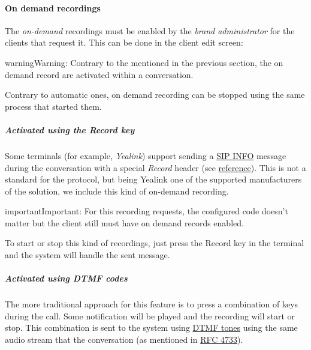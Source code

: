 \documentclass[letterpaper,10pt,english]{sphinxmanual}
\begin{document}
\paragraph{On demand recordings}
\label{administration_portal/client/residential/calls/call_recordings:on-demand-recordings}
The \emph{on-demand} recordings must be enabled by the \emph{brand administrator} for the
clients that request it. This can be done in the client edit screen:

\begin{notice}{warning}{Warning:}
Contrary to the {\hyperref[administration_portal/client/vpbx/services:services]{}} mentioned in the
previous section, the on demand record are activated within a conversation.
\end{notice}

Contrary to automatic ones, on demand recording can be stopped using the same
process that started them.


\subparagraph{Activated using the \emph{Record} key}
\label{administration_portal/client/residential/calls/call_recordings:activated-using-the-record-key}
Some terminals (for example, \emph{Yealink}) support sending a \href{https://tools.ietf.org/html/rfc6086}{SIP INFO} message during the conversation with a
special \emph{Record} header (see \href{http://www.yealink.com/Upload/document/UsingCallRecordingFeatureonYealinkPhones/UsingCallRecordingFeatureonYealinkSIPT2XPphonesRev\_610-20561729764.pdf}{reference}).
This is not a standard for the protocol, but being Yealink one of the supported
manufacturers of the solution, we include this kind of on-demand recording.

\begin{notice}{important}{Important:}
For this recording requests, the configured code doesn't matter
but the client still must have on demand records enabled.
\end{notice}

To start or stop this kind of recordings, just press the Record key in the
terminal and the system will handle the sent message.


\subparagraph{Activated using \emph{DTMF} codes}
\label{administration_portal/client/residential/calls/call_recordings:activated-using-dtmf-codes}
The more traditional approach for this feature is to press a combination of
keys during the call. Some notification will be played and the recording will
start or stop. This combination is sent to the system using \href{https://es.wikipedia.org/wiki/Marcaci\%C3\%B3n\_por\_tonos}{DTMF tones} using the same audio
stream that the conversation (as mentioned in \href{https://tools.ietf.org/html/rfc4733}{RFC 4733}).
\end{document}
